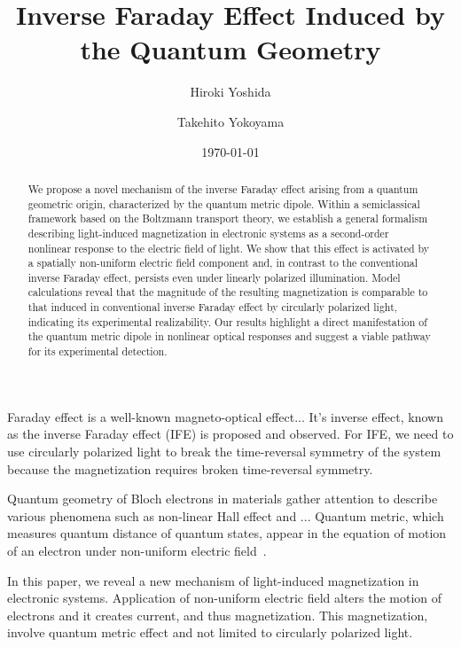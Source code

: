 \documentclass[aps,prb,longbibliography,superscriptaddress,twocolumn]{revtex4-2}
\begin{document}
\title{Inverse Faraday Effect Induced by the Quantum Geometry}

\author{Hiroki Yoshida}
\author{Takehito Yokoyama}


\date{\today}


\begin{abstract}
    We propose a novel mechanism of the inverse Faraday effect arising from a quantum geometric origin, characterized by the quantum metric dipole. Within a semiclassical framework based on the Boltzmann transport theory, we establish a general formalism describing light-induced magnetization in electronic systems as a second-order nonlinear response to the electric field of light. We show that this effect is activated by a spatially non-uniform electric field component and, in contrast to the conventional inverse Faraday effect, persists even under linearly polarized illumination. Model calculations reveal that the magnitude of the resulting magnetization is comparable to that induced in conventional inverse Faraday effect by circularly polarized light, indicating its experimental realizability. Our results highlight a direct manifestation of the quantum metric dipole in nonlinear optical responses and suggest a viable pathway for its experimental detection.
\end{abstract}

\maketitle

Faraday effect is a well-known magneto-optical effect... It's inverse effect, known as the inverse Faraday effect (IFE) is proposed and observed. For IFE, we need to use circularly polarized light to break the time-reversal symmetry of the system because the magnetization requires broken time-reversal symmetry.

Quantum geometry of Bloch electrons in materials gather attention to describe various phenomena such as non-linear Hall effect and ... Quantum metric, which measures quantum distance of quantum states, appear in the equation of motion of an electron under non-uniform electric field~\cite{Lapa_Hughes_2019}. 

In this paper, we reveal a new mechanism of light-induced magnetization in electronic systems. Application of non-uniform electric field alters the motion of electrons and it creates current, and thus magnetization. This magnetization, involve quantum metric effect and not limited to circularly polarized light.
\end{document}
